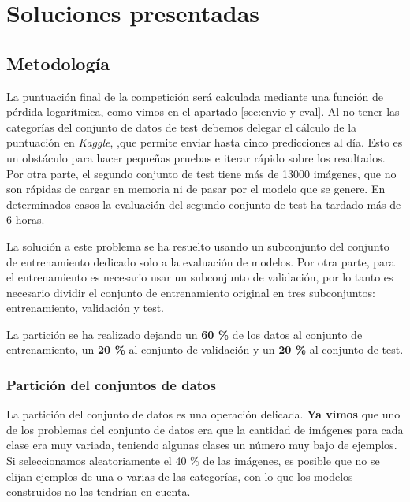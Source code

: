 
\chapter{Soluciones presentadas} %
\label{cap:soluciones} %

\section{Metodología}
\label{sec:metodology}

La puntuación final de la competición será calculada mediante una función de pérdida logarítmica, como vimos en el apartado \ref{sec:envio-y-eval}. Al no tener las categorías del conjunto de datos de test debemos delegar el cálculo de la puntuación en \textit{Kaggle}, ,que permite enviar hasta cinco predicciones al día. Esto es un obstáculo para hacer pequeñas pruebas e iterar rápido sobre los resultados. Por otra parte, el segundo conjunto de test tiene más de 13000 imágenes, que no son rápidas de cargar en memoria ni de pasar por el modelo que se genere. En determinados casos la evaluación del segundo conjunto de test ha tardado más de 6 horas.

La solución a este problema se ha resuelto usando un subconjunto del conjunto de entrenamiento dedicado solo a la evaluación de modelos. Por otra parte, para el entrenamiento es necesario usar un subconjunto de validación, por lo tanto es necesario dividir el conjunto de entrenamiento original en tres subconjuntos: entrenamiento, validación y test.

La partición se ha realizado dejando un \textbf{60 \%} de los datos al conjunto de entrenamiento, un \textbf{20 \%} al conjunto de validación y un \textbf{20 \%} al conjunto de test.


\subsection{Partición del conjuntos de datos}
La partición del conjunto de datos es una operación delicada. \textbf{Ya vimos} que uno de los problemas del conjunto de datos era que la cantidad de imágenes para cada clase era muy variada, teniendo algunas clases un número muy bajo de ejemplos. Si seleccionamos aleatoriamente el 40 \% de las imágenes, es posible que no se elijan ejemplos de una o varias de las categorías, con lo que los modelos construidos no las tendrían en cuenta.

